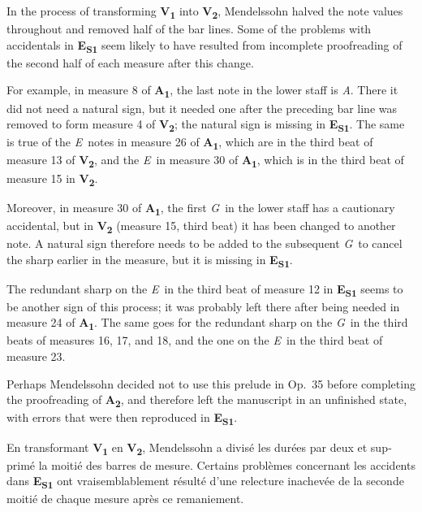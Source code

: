 \documentclass[a4paper, 12pt]{book}
\newcommand{\source}[2]{\textbf{#1\textsubscript{#2}}}
\newcommand{\bigdot}[0]{{\Large \textbullet}}
\newcommand{\centerbigdot}[0]{\begin{center}\bigdot\end{center}}
\begin{document}
{    In the process of transforming \source{V}{1} into \source{V}{2},
    Mendelssohn halved the note values throughout and removed half of
    the bar lines. Some of the problems with accidentals in
    \source{E}{S1} seem likely to have resulted from incomplete
    proofreading of the second half of each measure after this change.

    For example, in measure 8 of \source{A}{1}, the last note in the
    lower staff is \textit{A}\na. There it did not need a natural
    sign, but it needed one after the preceding bar line was removed
    to form measure 4 of \source{V}{2}; the natural sign is missing in
    \source{E}{S1}. The same is true of the \textit{E}\na\ notes in
    measure 26 of \source{A}{1}, which are in the third beat of
    measure 13 of \source{V}{2}, and the \textit{E}\na\ in measure 30
    of \source{A}{1}, which is in the third beat of measure 15 in
    \source{V}{2}.
    
    Moreover, in measure 30 of \source{A}{1}, the first
    \textit{G}\na\ in the lower staff has a cautionary accidental, but
    in \source{V}{2} (measure 15, third beat) it has been changed to
    another note. A natural sign therefore needs to be added to the
    subsequent \textit{G}\na\ to cancel the sharp earlier in the
    measure, but it is missing in \source{E}{S1}.

    The redundant sharp on the \textit{E}\sh\ in the third beat of
    measure 12 in \source{E}{S1} seems to be another sign of this
    process; it was probably left there after being needed in measure
    24 of \source{A}{1}. The same goes for the redundant sharp on the
    \textit{G}\sh\ in the third beats of measures 16, 17, and 18, and
    the one on the \textit{E}\sh\ in the third beat of measure 23.

    Perhaps Mendelssohn decided not to use this prelude in Op.\ 35
    before completing the proofreading of \source{A}{2}, and therefore
    left the manuscript in an unfinished state, with errors that were
    then reproduced in \source{E}{S1}.

    \centerbigdot

    \begin{otherlanguage}{french}
    En transformant \source{V}{1} en \source{V}{2}, Mendelssohn a
    divisé les durées par deux et supprimé la moitié des barres de
    mesure. Certains problèmes concernant les accidents dans
    \source{E}{S1} ont vraisemblablement résulté d'une relecture
    inachevée de la seconde moitié de chaque mesure après ce
    remaniement.


\end{otherlanguage}}
\end{document}
